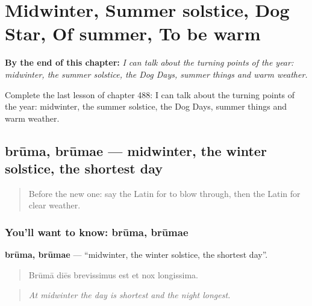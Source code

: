 
\chapter{Midwinter, Summer solstice, Dog Star, Of summer, To be warm}
\label{ch:la-midwinter-summer-solstice-dog-star-of-summer-to-be-warm}

\begin{chapteropening}
\textbf{By the end of this chapter:} \emph{I can talk about the turning points of the year: midwinter, the summer solstice, the Dog Days, summer things and warm weather.}

Complete the last lesson of chapter 488: I can talk about the turning points of the year: midwinter, the summer solstice, the Dog Days, summer things and warm weather.
\end{chapteropening}

\section[brūma, brūmae]{brūma, brūmae — midwinter, the winter solstice, the shortest day}

\label{lesson:LA-C488-bruma}



\begin{quote}
Before the new one: say the Latin for to blow through, then the Latin for clear weather.
\end{quote}

\subsection*{You'll want to know: brūma, brūmae}
\textbf{brūma, brūmae} — \textquotedblleft{}midwinter, the winter solstice, the shortest day\textquotedblright{}.

\begin{quote}
Brūmā diēs brevissimus est et nox longissima.
\end{quote}

\begin{quote}
\emph{At midwinter the day is shortest and the night longest.}
\end{quote}

